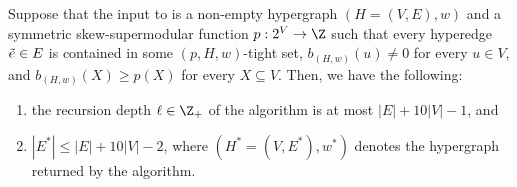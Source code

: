 \begin{lemma}\label{lem:WeakToStrongCover:NumberOfHyperedges}
Suppose that the input to  is a non-empty hypergraph $(H = (V, E), w)$ and a symmetric skew-supermodular function $p:2^V\rightarrow \Z$ 
such that every hyperedge $\Tilde{e} \in E$ is contained in some $(p, H, w)$-tight set, $b_{(H,w)}(u) \not = 0$ for every $u \in V$, and $b_{(H,w)}(X) \geq p(X)$ for every $X \subseteq V$. 
Then, we have the following:
    \begin{enumerate}
        \item the recursion depth $\ell \in \Z_+$ of the algorithm is at most $|E| + 10|V| - 1$, and
        \item $|E^*| \leq |E| + 10|V| - 2$, where $(H^* = (V, E^*), w^*)$ denotes the hypergraph returned by the algorithm.
    \end{enumerate}
\end{lemma}

